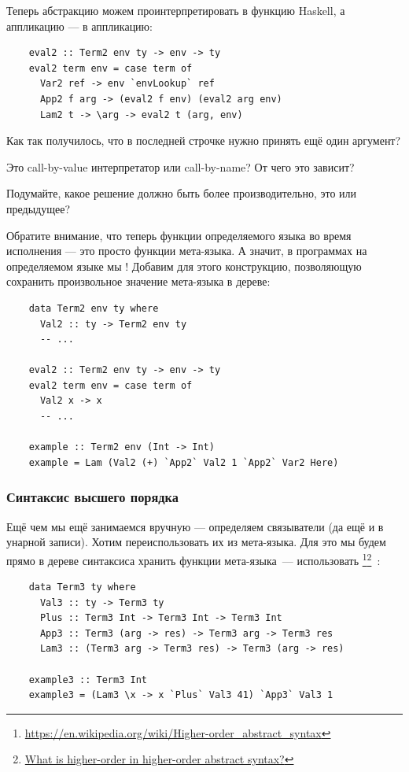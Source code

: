Теперь абстракцию можем проинтерпретировать в функцию Haskell, а аппликацию --- в аппликацию:
\begin{verbatim}
    eval2 :: Term2 env ty -> env -> ty
    eval2 term env = case term of
      Var2 ref -> env `envLookup` ref
      App2 f arg -> (eval2 f env) (eval2 arg env)
      Lam2 t -> \arg -> eval2 t (arg, env)
\end{verbatim}

\begin{task}
    Как так получилось, что в последней строчке нужно принять ещё один аргумент?
\end{task}

\begin{task}
    Это call-by-value интерпретатор или call-by-name?
    От чего это зависит?
\end{task}

\begin{task}
    Подумайте, какое решение должно быть более производительно, это или предыдущее?
\end{task}

Обратите внимание, что теперь функции определяемого языка во время исполнения --- это просто функции мета-языка.
А значит, в программах на определяемом языке мы !
Добавим для этого конструкцию, позволяющую сохранить произвольное значение мета-языка в дереве:
\begin{verbatim}
    data Term2 env ty where
      Val2 :: ty -> Term2 env ty
      -- ...

    eval2 :: Term2 env ty -> env -> ty
    eval2 term env = case term of
      Val2 x -> x
      -- ...

    example :: Term2 env (Int -> Int)
    example = Lam (Val2 (+) `App2` Val2 1 `App2` Var2 Here)
\end{verbatim}

\subsubsection{Синтаксис высшего порядка} \label{subsubsec:h-syntax}

Ещё чем мы ещё занимаемся вручную --- определяем связыватели (да ещё и в унарной записи).
Хотим переиспользовать их из мета-языка.
Для это мы будем прямо в дереве синтаксиса хранить функции мета-языка~--- использовать \footnote{\url{https://en.wikipedia.org/wiki/Higher-order_abstract_syntax}}\footnote{\href{https://cstheory.stackexchange.com/questions/20071/what-is-higher-order-in-higher-order-abstract-syntax}{What is higher-order in higher-order abstract syntax?}}~\cite{pfenning1988higher}:
\begin{verbatim}
    data Term3 ty where
      Val3 :: ty -> Term3 ty
      Plus :: Term3 Int -> Term3 Int -> Term3 Int
      App3 :: Term3 (arg -> res) -> Term3 arg -> Term3 res
      Lam3 :: (Term3 arg -> Term3 res) -> Term3 (arg -> res)

    example3 :: Term3 Int
    example3 = (Lam3 \x -> x `Plus` Val3 41) `App3` Val3 1
\end{verbatim}

